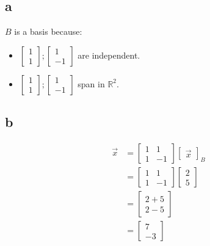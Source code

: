 \documentclass[10pt]{article}
\begin{document}
\subsection*{a}
\noindent $B$ is a basis because:
\begin{itemize}
    \item 
    $
        \begin{bmatrix}
            1 \\
            1
        \end{bmatrix};
        \begin{bmatrix}
            1 \\
            -1
        \end{bmatrix}
    $ are independent.
    \item $
        \begin{bmatrix}
            1 \\
            1
        \end{bmatrix};
        \begin{bmatrix}
            1 \\
            -1
        \end{bmatrix}
    $ span in $\mathbb{R}^2$.
\end{itemize}


\subsection*{b}
\begin{align*}
    \Vec{x}
    &=
    \begin{bmatrix}
        1 & 1 \\
        1 & -1
    \end{bmatrix}
    \begin{bmatrix}
        \Vec{x}
    \end{bmatrix}_B \\
    &=
    \begin{bmatrix}
        1 & 1 \\
        1 & -1
    \end{bmatrix}
    \begin{bmatrix}
        2 \\
        5
    \end{bmatrix} \\
    &=
    \begin{bmatrix}
        2 + 5 \\
        2 - 5
    \end{bmatrix} \\
    &=
    \begin{bmatrix}
        7 \\
        -3
    \end{bmatrix}
\end{align*}
\end{document}
